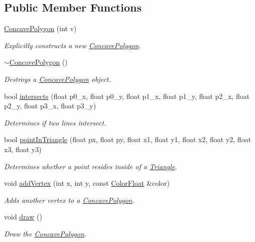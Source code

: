 \subsection*{Public Member Functions}
\begin{DoxyCompactItemize}
\item 
\hyperlink{classtsgl_1_1_concave_polygon_a1ffb0ac20bbfa7d35683209a3c79a979}{Concave\+Polygon} (int v)
\begin{DoxyCompactList}\small\item\em Explicitly constructs a new \hyperlink{classtsgl_1_1_concave_polygon}{Concave\+Polygon}. \end{DoxyCompactList}\item 
\hyperlink{classtsgl_1_1_concave_polygon_ae1465a7135bb7ef4aa00584fa63b2530}{$\sim$\+Concave\+Polygon} ()
\begin{DoxyCompactList}\small\item\em Destroys a \hyperlink{classtsgl_1_1_concave_polygon}{Concave\+Polygon} object. \end{DoxyCompactList}\item 
bool \hyperlink{classtsgl_1_1_concave_polygon_a0fdc4936df5e1bff64031041fa84fee5}{intersects} (float p0\+\_\+x, float p0\+\_\+y, float p1\+\_\+x, float p1\+\_\+y, float p2\+\_\+x, float p2\+\_\+y, float p3\+\_\+x, float p3\+\_\+y)
\begin{DoxyCompactList}\small\item\em Determines if two lines intersect. \end{DoxyCompactList}\item 
bool \hyperlink{classtsgl_1_1_concave_polygon_afb5de38c8571d6cc808aeaec000f4522}{point\+In\+Triangle} (float px, float py, float x1, float y1, float x2, float y2, float x3, float y3)
\begin{DoxyCompactList}\small\item\em Determines whether a point resides inside of a \hyperlink{classtsgl_1_1_triangle}{Triangle}. \end{DoxyCompactList}\item 
void \hyperlink{classtsgl_1_1_concave_polygon_ae2675ff0bf54cc7092a9ab3418dcab30}{add\+Vertex} (int x, int y, const \hyperlink{structtsgl_1_1_color_float}{Color\+Float} \&color)
\begin{DoxyCompactList}\small\item\em Adds another vertex to a \hyperlink{classtsgl_1_1_concave_polygon}{Concave\+Polygon}. \end{DoxyCompactList}\item 
void \hyperlink{classtsgl_1_1_concave_polygon_a06d759932483ae2b54bb807db20cbc4a}{draw} ()
\begin{DoxyCompactList}\small\item\em Draw the \hyperlink{classtsgl_1_1_concave_polygon}{Concave\+Polygon}. \end{DoxyCompactList}\end{DoxyCompactItemize}
